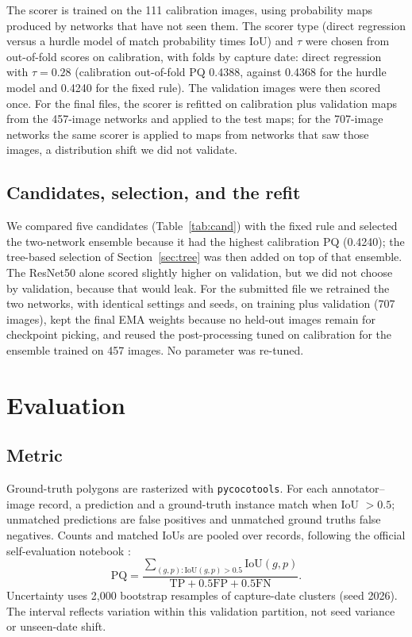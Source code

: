 \documentclass[sigconf]{acmart}
\begin{document}
The scorer is trained on the 111 calibration images, using probability maps produced by networks that have not seen them. The scorer type (direct regression versus a hurdle model of match probability times IoU) and $\tau$ were chosen from out-of-fold scores on calibration, with folds by capture date: direct regression with $\tau=0.28$ (calibration out-of-fold PQ 0.4388, against 0.4368 for the hurdle model and 0.4240 for the fixed rule). The validation images were then scored once. For the final files, the scorer is refitted on calibration plus validation maps from the 457-image networks and applied to the test maps; for the 707-image networks the same scorer is applied to maps from networks that saw those images, a distribution shift we did not validate.

\subsection{Candidates, selection, and the refit}\label{sec:refit}
We compared five candidates (Table~\ref{tab:cand}) with the fixed rule and selected the two-network ensemble because it had the highest calibration PQ (0.4240); the tree-based selection of Section~\ref{sec:tree} was then added on top of that ensemble. The ResNet50 alone scored slightly higher on validation, but we did not choose by validation, because that would leak. For the submitted file we retrained the two networks, with identical settings and seeds, on training plus validation (707 images), kept the final EMA weights because no held-out images remain for checkpoint picking, and reused the post-processing tuned on calibration for the ensemble trained on 457 images. No parameter was re-tuned.

\section{Evaluation}\label{sec:evaluation}
\subsection{Metric}
Ground-truth polygons are rasterized with \texttt{pycocotools}. For each annotator--image record, a prediction and a ground-truth instance match when IoU $>0.5$; unmatched predictions are false positives and unmatched ground truths false negatives. Counts and matched IoUs are pooled over records, following the official self-evaluation notebook \cite{evaluation}:
\begin{equation}
\mathrm{PQ}=\frac{\sum_{(g,p):\mathrm{IoU}(g,p)>0.5}\mathrm{IoU}(g,p)}{\mathrm{TP}+0.5\mathrm{FP}+0.5\mathrm{FN}}.
\end{equation}
Uncertainty uses 2,000 bootstrap resamples of capture-date clusters (seed 2026). The interval reflects variation within this validation partition, not seed variance or unseen-date shift.
\end{document}
